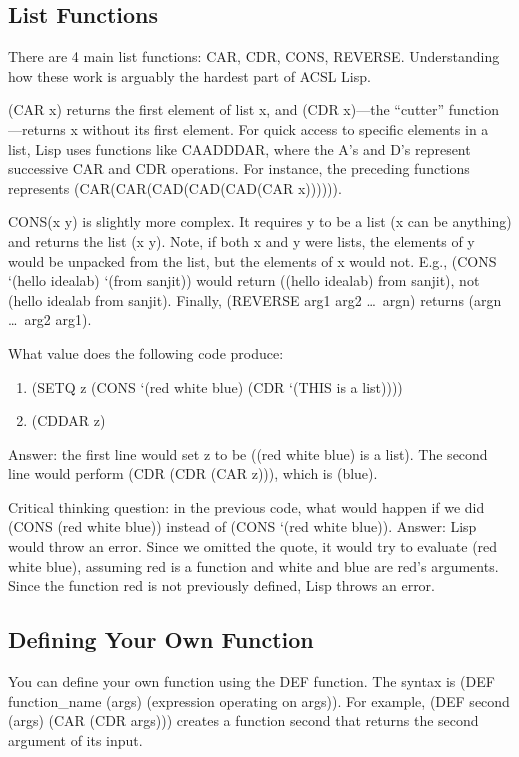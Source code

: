 \documentclass[11pt,letterpaper]{article}
\begin{document}
    \subsection{List Functions}
    There are 4 main list functions: CAR, CDR, CONS, REVERSE.
    Understanding how these work is arguably the hardest part of ACSL Lisp.

    (CAR x) returns the first element of list x, and (CDR x)---the ``cutter'' function---returns
    x without its first element.
    For quick access to specific elements in a list, Lisp
    uses functions like CAADDDAR, where the A's and D's represent successive
    CAR and CDR operations.
    For instance, the preceding functions represents (CAR(CAR(CAD(CAD(CAD(CAR x)))))).

    CONS(x y) is slightly more complex.
    It requires y to be a list (x can be anything) and returns the list (x y).
    Note, if both x and y were lists, the elements of y would be unpacked from
    the list, but the elements of x would not.
    E.g., (CONS `(hello idealab) `(from sanjit)) would return ((hello idealab) from sanjit),
    not (hello idealab from sanjit).
    Finally, (REVERSE arg1 arg2 \ldots~argn) returns (argn \ldots~arg2 arg1).

    What value does the following code produce:
    \begin{enumerate}
        \item (SETQ z (CONS `(red white blue) (CDR `(THIS is a list))))
        \item (CDDAR z)
    \end{enumerate}
    Answer: the first line would set z to be ((red white blue) is a list).
    The second line would perform (CDR (CDR (CAR z))), which is (blue).

    Critical thinking question: in the previous code, what would
    happen if we did (CONS (red white blue)) instead of (CONS `(red white blue)).
    Answer: Lisp would throw an error.
    Since we omitted the quote, it would try to evaluate (red white blue),
    assuming red is a function and white and blue are red's arguments.
    Since the function red is not previously defined, Lisp throws an error.

    \subsection{Defining Your Own Function}
    You can define your own function using the DEF function.
    The syntax is (DEF function\_name (args) (expression operating on args)).
    For example, (DEF second (args) (CAR (CDR args))) creates
    a function second that returns the second argument of its input.
\end{document}
